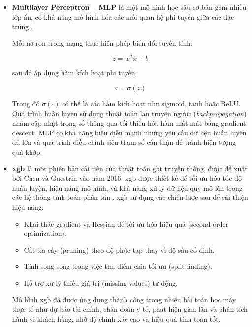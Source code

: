 \begin{itemize}
\item \textbf{Multilayer Perceptron -- MLP} là một mô hình học sâu cơ bản gồm nhiều lớp ẩn, có khả năng mô hình hóa các mối quan hệ phi tuyến giữa các đặc trưng \cite{rumelhart1986learning}. 

Mỗi nơ-ron trong mạng thực hiện phép biến đổi tuyến tính:

\begin{equation}
z = w^T x + b
\end{equation}

sau đó áp dụng hàm kích hoạt phi tuyến:

\begin{equation}
a = \sigma(z)
\end{equation}

Trong đó $\sigma(\cdot)$ có thể là các hàm kích hoạt như sigmoid, tanh hoặc ReLU. Quá trình huấn luyện sử dụng thuật toán lan truyền ngược (\textit{backpropagation}) nhằm cập nhật trọng số thông qua tối thiểu hóa hàm mất mát bằng gradient descent. MLP có khả năng biểu diễn mạnh nhưng yêu cầu dữ liệu huấn luyện đủ lớn và quá trình điều chỉnh siêu tham số cẩn thận để tránh hiện tượng quá khớp.

\item \textbf{\ac{xgb}} là một phiên bản cải tiến của thuật toán \ac{gbt} truyền thống, được đề xuất bởi Chen và Guestrin vào năm 2016. \ac{xgb} được thiết kế để tối ưu hóa tốc độ huấn luyện, hiệu năng mô hình, và khả năng xử lý dữ liệu quy mô lớn trong các hệ thống tính toán phân tán \cite{chen2016xgboost}. \ac{xgb} sử dụng các chiến lược sau để cải thiện hiệu năng:
\begin{itemize}
    \item Khai thác gradient và Hessian để tối ưu hóa hiệu quả (second-order optimization).
    \item Cắt tỉa cây (pruning) theo độ phức tạp thay vì độ sâu cố định.
    \item Tính song song trong việc tìm điểm chia tối ưu (split finding).
    \item Hỗ trợ xử lý thiếu giá trị (missing values) tự động.
\end{itemize}

Mô hình \ac{xgb} đã được ứng dụng thành công trong nhiều bài toán học máy thực tế như dự báo tài chính, chẩn đoán y tế, phát hiện gian lận và phân tích hành vi khách hàng, nhờ độ chính xác cao và hiệu quả tính toán tốt.
\end{itemize}
